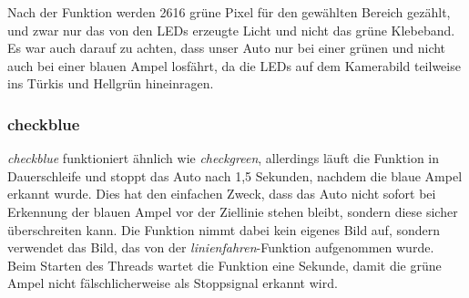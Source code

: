 \documentclass[a4paper, 12pt]{scrartcl}
\begin{document}
Nach der Funktion werden 2616 grüne Pixel für den gewählten Bereich gezählt, und zwar nur das von den LEDs erzeugte Licht und nicht das grüne Klebeband. Es war auch darauf zu achten, dass unser Auto nur bei einer grünen und nicht auch bei einer blauen Ampel losfährt, da die LEDs auf dem Kamerabild teilweise ins Türkis und Hellgrün hineinragen.


\subsubsection{checkblue}


\textit{checkblue} funktioniert ähnlich wie \textit{checkgreen}, allerdings läuft die Funktion in Dauerschleife und stoppt das Auto nach 1,5 Sekunden, nachdem die blaue Ampel erkannt wurde. Dies hat den einfachen Zweck, dass das Auto nicht sofort bei Erkennung der blauen Ampel vor der Ziellinie stehen bleibt, sondern diese sicher überschreiten kann. Die Funktion nimmt dabei kein eigenes Bild auf, sondern verwendet das Bild, das von der \textit{linienfahren}-Funktion aufgenommen wurde. Beim Starten des Threads wartet die Funktion eine Sekunde, damit die grüne Ampel nicht fälschlicherweise als Stoppsignal erkannt wird.
\end{document}

